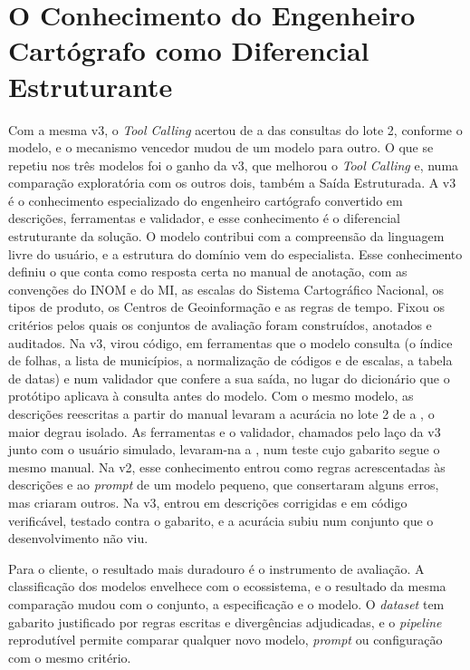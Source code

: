 \section{O Conhecimento do Engenheiro Cartógrafo como Diferencial Estruturante}
\label{sec:engenheiro}

Com a mesma v3, o \textit{Tool Calling} acertou de  a  das consultas do lote 2, conforme o modelo, e o mecanismo vencedor mudou de um modelo para outro. O que se repetiu nos três modelos foi o ganho da v3, que melhorou o \textit{Tool Calling} e, numa comparação exploratória com os outros dois, também a Saída Estruturada. A v3 é o conhecimento especializado do engenheiro cartógrafo convertido em descrições, ferramentas e validador, e esse conhecimento é o diferencial estruturante da solução. O modelo contribui com a compreensão da linguagem livre do usuário, e a estrutura do domínio vem do especialista. Esse conhecimento definiu o que conta como resposta certa no manual de anotação, com as convenções do INOM e do MI, as escalas do Sistema Cartográfico Nacional, os tipos de produto, os Centros de Geoinformação e as regras de tempo. Fixou os critérios pelos quais os conjuntos de avaliação foram construídos, anotados e auditados. Na v3, virou código, em ferramentas que o modelo consulta (o índice de folhas, a lista de municípios, a normalização de códigos e de escalas, a tabela de datas) e num validador que confere a sua saída, no lugar do dicionário que o protótipo aplicava à consulta antes do modelo. Com o mesmo modelo, as descrições reescritas a partir do manual levaram a acurácia no lote 2 de  a , o maior degrau isolado. As ferramentas e o validador, chamados pelo laço da v3 junto com o usuário simulado, levaram-na a , num teste cujo gabarito segue o mesmo manual. Na v2, esse conhecimento entrou como regras acrescentadas às descrições e ao \textit{prompt} de um modelo pequeno, que consertaram alguns erros, mas criaram outros. Na v3, entrou em descrições corrigidas e em código verificável, testado contra o gabarito, e a acurácia subiu num conjunto que o desenvolvimento não viu.

Para o cliente, o resultado mais duradouro é o instrumento de avaliação. A classificação dos modelos envelhece com o ecossistema, e o resultado da mesma comparação mudou com o conjunto, a especificação e o modelo. O \textit{dataset} tem gabarito justificado por regras escritas e divergências adjudicadas, e o \textit{pipeline} reprodutível permite comparar qualquer novo modelo, \textit{prompt} ou configuração com o mesmo critério.
